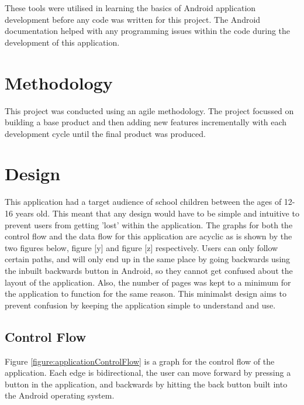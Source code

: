 \documentclass{article}
\begin{document}
These tools were utilised in learning the basics of Android application development before any code was written for this project. The Android documentation helped with any programming issues within the code during the development of this application. 

\section{Methodology}
\label{section:methodology}

This project was conducted using an agile methodology. The project focussed on building a base product and then adding new features incrementally with each development cycle until the final product was produced. 


\section{Design}
\label{section:design}

This application had a target audience of school children between the ages of 12-16 years old. This meant that any design would have to be simple and intuitive to prevent users from getting 'lost' within the application. The graphs for both the control flow and the data flow for this application are acyclic as is shown by the two figures below, figure [y] and figure [z] respectively. Users can only follow certain paths, and will only end up in the same place by going backwards using the inbuilt backwards button in Android, so they cannot get confused about the layout of the application. Also, the number of pages was kept to a minimum for the application to function for the same reason. This minimalst design aims to prevent confusion by keeping the application simple to understand and use. \\

\subsection{Control Flow}

Figure \ref{figure:applicationControlFlow} is a graph for the control flow of the application. Each edge is bidirectional, the user can move forward by pressing a button in the application, and backwards by hitting the back button built into the Android operating system. \\
\end{document}
